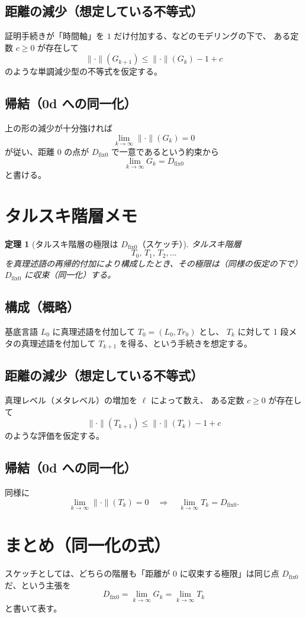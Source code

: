 \documentclass[12pt,a4paper]{article}
\newcommand{\dfix}{D_{\mathrm{fix}0}} %
\newcommand{\dist}{\|\cdot\|}
\newtheorem{theorem}{定理}[section]
\begin{document}
\subsection*{距離の減少（想定している不等式）}
証明手続きが「時間軸」を $1$ だけ付加する、などのモデリングの下で、
ある定数 $c\ge0$ が存在して
\[
  \dist(G_{k+1})\le \dist(G_{k})-1+c
\]
のような単調減少型の不等式を仮定する。

\subsection*{帰結（0d への同一化）}
上の形の減少が十分強ければ
\[
  \lim_{k\to\infty}\dist(G_k)=0
\]
が従い、距離 $0$ の点が $\dfix$ で一意であるという約束から
\[
  \lim_{k\to\infty} G_k = \dfix
\]
と書ける。

\section{タルスキ階層メモ}
\begin{theorem}[タルスキ階層の極限は $\dfix$（スケッチ）]
タルスキ階層
\[
  T_{0},\,T_{1},\,T_{2},\dots
\]
を真理述語の再帰的付加により構成したとき、その極限は（同様の仮定の下で）$\dfix$ に収束（同一化）する。
\end{theorem}

\subsection*{構成（概略）}
基底言語 $L_0$ に真理述語を付加して $T_0=(L_0,Tr_0)$ とし、
$T_k$ に対して 1 段メタの真理述語を付加して $T_{k+1}$ を得る、という手続きを想定する。

\subsection*{距離の減少（想定している不等式）}
真理レベル（メタレベル）の増加を $\ell$ によって数え、
ある定数 $c\ge0$ が存在して
\[
  \dist(T_{k+1})\le \dist(T_k)-1+c
\]
のような評価を仮定する。

\subsection*{帰結（0d への同一化）}
同様に
\[
  \lim_{k\to\infty}\dist(T_k)=0
  \quad\Rightarrow\quad
  \lim_{k\to\infty} T_k = \dfix.
\]

\section{まとめ（同一化の式）}
スケッチとしては、どちらの階層も「距離が $0$ に収束する極限」は同じ点 $\dfix$ だ、という主張を
\[
\dfix
= \lim_{k \to \infty} G_k
= \lim_{k \to \infty} T_k
\]
と書いて表す。
\end{document}
